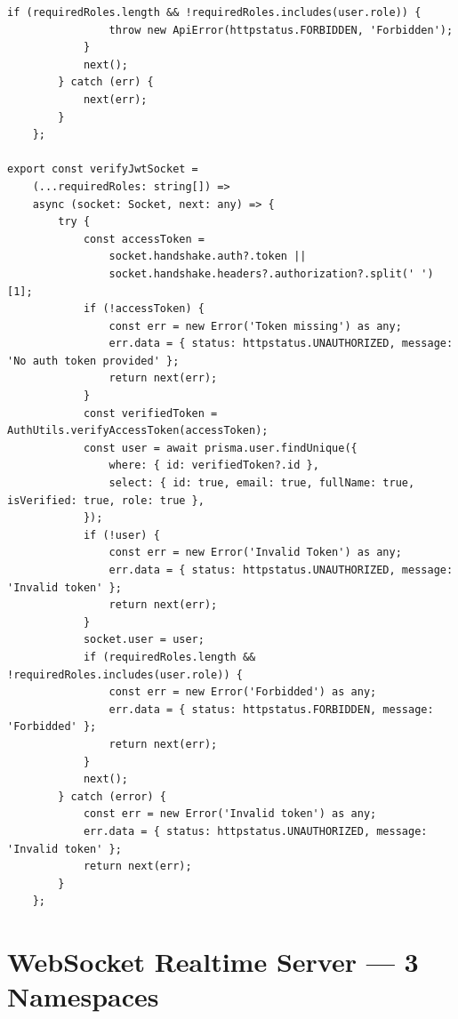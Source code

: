 \begin{lstlisting}[caption={JWT Authentication + RBAC + Socket.IO auth guard --- \texttt{src/middlewares/auth.middleware.ts} --- Author: Naim --- 24 Feb 2026},label=lst:auth]
            if (requiredRoles.length && !requiredRoles.includes(user.role)) {
                throw new ApiError(httpstatus.FORBIDDEN, 'Forbidden');
            }
            next();
        } catch (err) {
            next(err);
        }
    };

export const verifyJwtSocket =
    (...requiredRoles: string[]) =>
    async (socket: Socket, next: any) => {
        try {
            const accessToken =
                socket.handshake.auth?.token ||
                socket.handshake.headers?.authorization?.split(' ')[1];
            if (!accessToken) {
                const err = new Error('Token missing') as any;
                err.data = { status: httpstatus.UNAUTHORIZED, message: 'No auth token provided' };
                return next(err);
            }
            const verifiedToken = AuthUtils.verifyAccessToken(accessToken);
            const user = await prisma.user.findUnique({
                where: { id: verifiedToken?.id },
                select: { id: true, email: true, fullName: true, isVerified: true, role: true },
            });
            if (!user) {
                const err = new Error('Invalid Token') as any;
                err.data = { status: httpstatus.UNAUTHORIZED, message: 'Invalid token' };
                return next(err);
            }
            socket.user = user;
            if (requiredRoles.length && !requiredRoles.includes(user.role)) {
                const err = new Error('Forbidded') as any;
                err.data = { status: httpstatus.FORBIDDEN, message: 'Forbidded' };
                return next(err);
            }
            next();
        } catch (error) {
            const err = new Error('Invalid token') as any;
            err.data = { status: httpstatus.UNAUTHORIZED, message: 'Invalid token' };
            return next(err);
        }
    };
\end{lstlisting}

\section{WebSocket Realtime Server --- 3 Namespaces}
\label{app:websocket}

